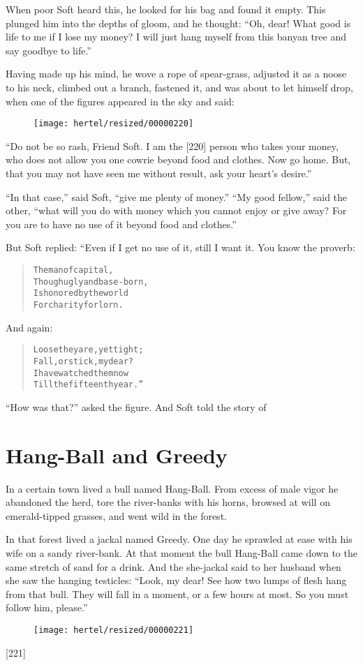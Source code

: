 \documentclass[article, twoside, 10pt]{memoir}
\renewenvironment{verbatim}{%
\begin{quote}%
\vskip -10pt%
\begin{alltt}\normalfont\small}{\end{alltt}%
\end{quote}%
\vskip -10pt
} %
\begin{document}
When poor Soft heard this, he looked for his bag and found it
empty. This plunged him into the depths of gloom, and he thought:
``Oh, dear! What good is life to me if I lose my money? I will just hang myself from this banyan tree and say goodbye to life.''

Having made up his mind, he wove a rope of spear-grass, adjusted it
as a noose to his neck, climbed out a branch, fastened it, and was
about to let himself drop, when one of the figures appeared in the
sky and said:
\begin{figure}[p]\texttt{[image: hertel/resized/00000220]}\end{figure}``Do not be so rash, Friend Soft. I am the [220] person who takes your money, who does not allow you one cowrie beyond food and clothes. Now go home. But, that you may not have seen me without result, ask your heart's desire.''

``In that case,'' said Soft, ``give me plenty of money.''
``My good fellow,'' said the other,
``what will you do with money which you cannot enjoy or give away? For you are to have no use of it beyond food and clothes.''

But Soft replied: “Even if I get no use of it, still I want it. You
know the proverb:

\begin{verbatim}
The man of capital,
    Though ugly and base-born,
Is honored by the world
    For charity forlorn.
\end{verbatim}
And again:

\begin{verbatim}
Loose they are, yet tight;
    Fall, or stick, my dear?
I have watched them now
    Till the fifteenth year.”
\end{verbatim}
``How was that?'' asked the figure. And Soft told the story of

\chapter{Hang-Ball and Greedy}

In a certain town lived a bull named Hang-Ball. From excess of male
vigor he abandoned the herd, tore the river-banks with his horns,
browsed at will on emerald-tipped grasses, and went wild in the
forest.

In that forest lived a jackal named Greedy. One day he sprawled at
ease with his wife on a sandy river-bank. At that moment the bull
Hang-Ball came down to the same stretch of sand for a drink. And
the she-jackal said to her husband when she saw the hanging
testicles:
``Look, my dear! See how two lumps of flesh hang from that bull. They will fall in a moment, or a few hours at most. So you must follow him, please.''
\begin{figure}[p]\texttt{[image: hertel/resized/00000221]}\end{figure}[221]
\end{document}
